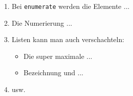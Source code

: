 \documentclass{article}
\begin{document}
\begin{enumerate}
 
\item Bei \texttt{enumerate}
werden die Elemente ...
 
\item Die Numerierung ...
 
\item Listen kann man auch
verschachteln:
  \begin{itemize}
 
  \item Die super maximale ...
 
  \item Bezeichnung und ...
  \end{itemize}
 
\item usw.
\end{enumerate}
   
\end{document}
